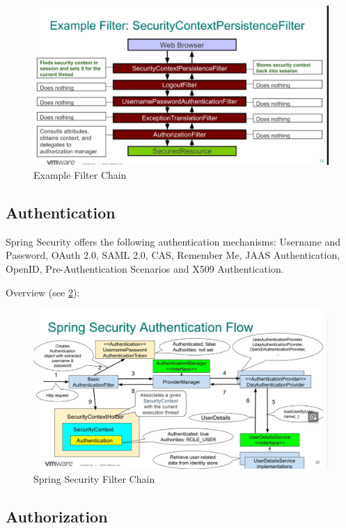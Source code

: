 \documentclass{scrartcl}
\begin{document}
\begin{figure} [h]
    \centering
    \includegraphics[width=1\linewidth]{filter-chain-example}
    \caption{Example Filter Chain}
    \label{fig:filter-chain-example}
\end{figure}

\subsection{Authentication}

Spring Security offers the following authentication mechanisms: Username and Password, OAuth 2.0, SAML 2.0, CAS, Remember Me, JAAS Authentication, OpenID, Pre-Authentication Scenarios and X509 Authentication.

Overview (see \ref{fig:authentication}):

\begin{figure}[h]
    \centering
    \includegraphics[width=1\linewidth]{authentication}
    \caption{Spring Security Filter Chain}
    \label{fig:authentication}
\end{figure}
\subsection{Authorization}
\end{document}
